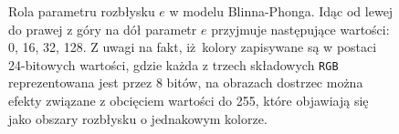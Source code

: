 \begin{figure}[H]
\centering
{}

\caption[Rola parametru rozbłysku $e$ w modelu Blinna-Phonga]{Rola parametru rozbłysku $e$ w modelu Blinna-Phonga. Idąc od lewej do prawej z góry na dół parametr $e$ przyjmuje następujące wartości: 0, 16, 32, 128. Z uwagi na fakt, iż~kolory zapisywane są w postaci 24-bitowych wartości, gdzie każda z trzech składowych \texttt{RGB} reprezentowana jest przez 8 bitów, na obrazach dostrzec można efekty związane z obcięciem wartości do 255, które objawiają się jako obszary rozbłysku o jednakowym kolorze.}
\label{ch3:img:blinn_phong}
\end{figure}